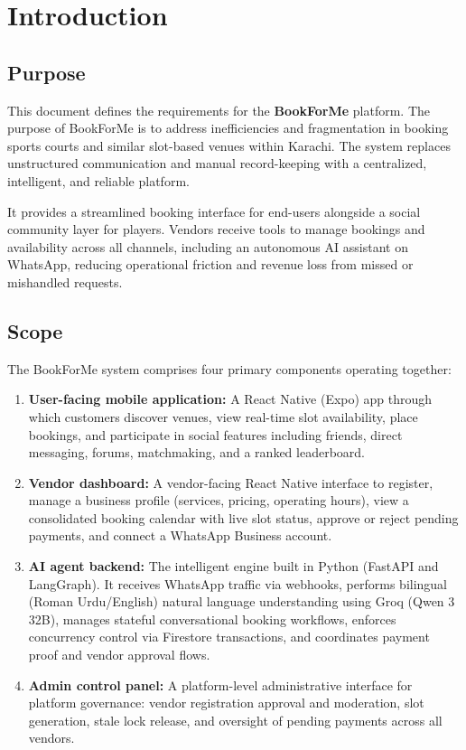 
\section{Introduction}

\subsection{Purpose}
This document defines the requirements for the \textbf{BookForMe} platform. The purpose of BookForMe is to address inefficiencies and fragmentation in booking sports courts and similar slot-based venues within Karachi. The system replaces unstructured communication and manual record-keeping with a centralized, intelligent, and reliable platform.

It provides a streamlined booking interface for end-users alongside a social community layer for players. Vendors receive tools to manage bookings and availability across all channels, including an autonomous AI assistant on WhatsApp, reducing operational friction and revenue loss from missed or mishandled requests.

\subsection{Scope}
The BookForMe system comprises four primary components operating together:
\begin{enumerate}
  \item \textbf{User-facing mobile application:} A React Native (Expo) app through which customers discover venues, view real-time slot availability, place bookings, and participate in social features including friends, direct messaging, forums, matchmaking, and a ranked leaderboard.
  \item \textbf{Vendor dashboard:} A vendor-facing React Native interface to register, manage a business profile (services, pricing, operating hours), view a consolidated booking calendar with live slot status, approve or reject pending payments, and connect a WhatsApp Business account.
  \item \textbf{AI agent backend:} The intelligent engine built in Python (FastAPI and LangGraph). It receives WhatsApp traffic via webhooks, performs bilingual (Roman Urdu/English) natural language understanding using Groq (Qwen 3 32B), manages stateful conversational booking workflows, enforces concurrency control via Firestore transactions, and coordinates payment proof and vendor approval flows.
  \item \textbf{Admin control panel:} A platform-level administrative interface for platform governance: vendor registration approval and moderation, slot generation, stale lock release, and oversight of pending payments across all vendors.
\end{enumerate}

